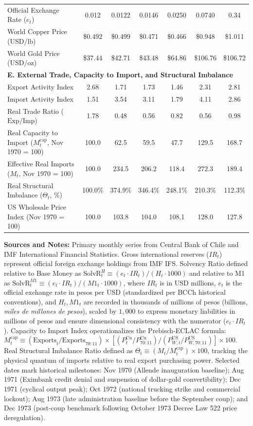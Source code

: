 \begin{table}[H]
{\begin{tabular}{lcccccc}
Official Exchange Rate ($e_t$) & 0.012 & 0.0122 & 0.0146 & 0.0250 & 0.0740 & 0.34 \\
World Copper Price (USD/lb) & \$0.492 & \$0.499 & \$0.471 & \$0.466 & \$0.948 & \$1.011 \\
World Gold Price (USD/oz) & \$37.44 & \$42.71 & \$43.48 & \$64.86 & \$106.76 & \$106.72 \\
\midrule
\multicolumn{7}{l}{\textbf{E. External Trade, Capacity to Import, and Structural Imbalance}} \\[0.2em]
Export Activity Index & 2.68 & 1.71 & 1.73 & 1.46 & 2.31 & 2.81 \\
Import Activity Index & 1.51 & 3.54 & 3.11 & 1.79 & 4.11 & 2.86 \\
Real Trade Ratio ($\text{Exp}/\text{Imp}$) & 1.78 & 0.48 & 0.56 & 0.82 & 0.56 & 0.98 \\
Real Capacity to Import ($M^{\text{cap}}_t$, Nov 1970 = 100) & 100.0 & 62.5 & 59.5 & 47.7 & 129.5 & 168.7 \\
Effective Real Imports ($M_t$, Nov 1970 = 100) & 100.0 & 234.5 & 206.2 & 118.4 & 272.3 & 189.4 \\
Real Structural Imbalance ($\Theta_t$, \%) & 100.0\% & 374.9\% & 346.4\% & 248.1\% & 210.3\% & 112.3\% \\
US Wholesale Price Index (Nov 1970 = 100) & 100.0 & 103.8 & 104.0 & 108.1 & 128.0 & 127.8 \\
\bottomrule
\end{tabular}%
}
\vspace{0.3em}
\begin{minipage}{\textwidth}
\footnotesize \textbf{Sources and Notes:} Primary monthly series from Central Bank of Chile and IMF International Financial Statistics. Gross international reserves ($IR_t$) represent official foreign exchange holdings from IMF IFS. Solvency Ratio defined relative to Base Money as $\text{SolvR}^{H}_t \equiv (e_t \cdot IR_t) / (H_t \cdot 1000)$ and relative to M1 as $\text{SolvR}^{M1}_t \equiv (e_t \cdot IR_t) / (M1_t \cdot 1000)$, where $IR_t$ is in USD millions, $e_t$ is the official exchange rate in pesos per USD (standardized per BCCh historical conventions), and $H_t, M1_t$ are recorded in thousands of millions of pesos (billions, \emph{miles de millones de pesos}), scaled by $1{,}000$ to express monetary liabilities in millions of pesos and ensure dimensional consistency with the numerator ($e_t \cdot IR_t$). Capacity to Import Index operationalizes the Prebisch-ECLAC formula: $M^{\text{cap}}_t \equiv (\text{Exports}_t / \text{Exports}_{70:11}) \times [(P^{\text{Cu}}_t / P^{\text{Cu}}_{70:11}) / (P^{\text{US}}_{W,t} / P^{\text{US}}_{W,70:11})] \times 100$. Real Structural Imbalance Ratio defined as $\Theta_t \equiv (M_t / M^{\text{cap}}_t) \times 100$, tracking the physical quantum of imports relative to real export purchasing power. Selected dates mark historical milestones: Nov 1970 (Allende inauguration baseline); Aug 1971 (Eximbank credit denial and suspension of dollar-gold convertibility); Dec 1971 (cyclical output peak); Oct 1972 (national trucking strike and commercial lockout); Aug 1973 (late administration baseline before the September coup); and Dec 1973 (post-coup benchmark following October 1973 Decree Law 522 price deregulation).

\end{minipage}
\end{table}
